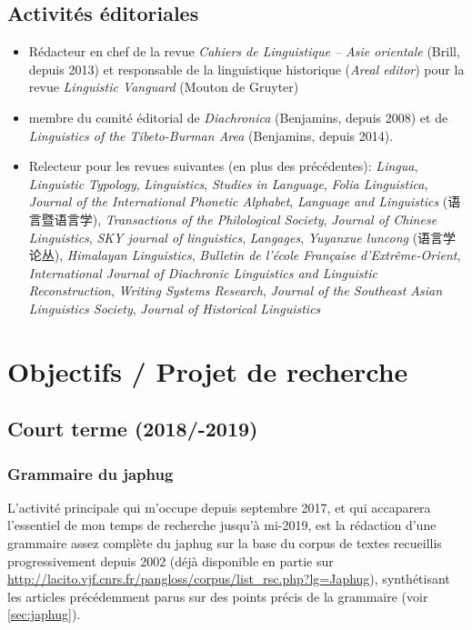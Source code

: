 \documentclass[oldfontcommands,oneside,a4paper,11pt]{article}
\newcommand{\zh}[1]{{\cn #1}}
\begin{document}
\subsection{Activités éditoriales}
\begin{itemize}
\item Rédacteur en chef de la revue \textit{Cahiers de Linguistique -- Asie orientale} (Brill, depuis 2013) et responsable de la linguistique historique (\textit{Areal editor}) pour la revue \textit{Linguistic Vanguard} (Mouton de Gruyter)
\item membre du comité éditorial de \textit{Diachronica} (Benjamins, depuis 2008) et de \textit{Linguistics of the Tibeto-Burman Area}  (Benjamins, depuis 2014).
\item Relecteur pour les revues suivantes (en plus des précédentes):  \textit{Lingua}, \textit{Linguistic Typology}, \textit{Linguistics}, \textit{Studies in Language}, \textit{Folia Linguistica}, \textit{Journal of the International Phonetic Alphabet},  \textit{Language and Linguistics} (\zh{语言暨语言学}), \textit{Transactions of the Philological Society}, \textit{Journal of Chinese Linguistics}, \textit{SKY journal of linguistics}, \textit{Langages}, \textit{Yuyanxue luncong} (\zh{语言学论丛}), 	\textit{Himalayan Linguistics}, \textit{Bulletin de l’école Française d’Extrême-Orient}, 	\textit{International Journal of Diachronic Linguistics and Linguistic Reconstruction}, \textit{Writing Systems Research}, 	\textit{Journal of the Southeast Asian Linguistics Society}, \textit{Journal of Historical Linguistics}
\end{itemize}

\section{Objectifs / Projet de recherche}

\subsection{Court terme (2018/-2019)}

\subsubsection{Grammaire du japhug}
L'activité principale qui m'occupe depuis septembre 2017, et qui accaparera l'essentiel de mon temps de recherche jusqu'à mi-2019, est la rédaction d'une grammaire assez complète du japhug sur la base du corpus de textes recueillis progressivement depuis 2002 (déjà disponible en partie sur \url{http://lacito.vjf.cnrs.fr/pangloss/corpus/list\_rsc.php?lg=Japhug}), synthétisant les articles précédemment parus sur des points précis de la grammaire (voir \ref{sec:japhug}). 
\end{document}
